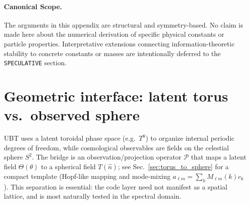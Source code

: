 \paragraph{Canonical Scope.}
The arguments in this appendix are structural and symmetry-based.
No claim is made here about the numerical derivation of specific physical constants
or particle properties. Interpretative extensions connecting information-theoretic
stability to concrete constants or masses are intentionally deferred to the
\texttt{SPECULATIVE} section.



\section{Geometric interface: latent torus vs.\ observed sphere}
\label{sec:geom_interface}

UBT uses a latent toroidal phase space (e.g.\ $T^8$) to organize internal periodic degrees of freedom, while
cosmological observables are fields on the celestial sphere $S^2$. The bridge is an observation/projection operator
$\mathcal{P}$ that maps a latent field $\Theta(\theta)$ to a spherical field $T(\hat n)$; see
Sec.~\ref{sec:torus_to_sphere} for a compact template (Hopf-like mapping and mode-mixing
$a_{\ell m}=\sum_k M_{\ell m}(k)c_k$). This separation is essential: the code layer need not manifest as a spatial lattice,
and is most naturally tested in the spectral domain.

